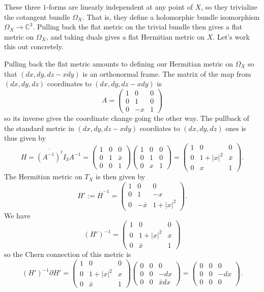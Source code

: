 \documentclass[11pt]{article}
\theoremstyle{definition}
\newcommand{\kk}[1]{\mathbb{#1}}
\begin{document}
These three $1$-forms are linearly independent at any point of $X$, so they trivialize the cotangent bundle $\Omega_X$. That is, they define a holomorphic bundle isomorphism $\Omega_X \to \kk C^3$. Pulling back the flat metric on the trivial bundle then gives a flat metric on $\Omega_X$, and taking duals gives a flat Hermitian metric on $X$. Let's work this out concretely.

Pulling back the flat metric amounts to defining our Hermitian metric on $\Omega_X$ so that $(dx, dy, dz - xdy)$ is an orthonormal frame. The matrix of the map from $(dx, dy, dz)$ coordinates to $(dx, dy, dz - xdy)$ is
$$
A = \begin{pmatrix}
1 & 0 & 0 \\
0 & 1 & 0 \\
0 & -x & 1
\end{pmatrix}
$$
so its inverse gives the coordinate change going the other way. The pullback of the standard metric in $(dx, dy, dz-x dy)$ coordiates to $(dx, dy, dz)$ ones is thus given by
$$
H = \overline{(A^{-1})^t} I_3 A^{-1}
=
\begin{pmatrix}
1 & 0 & 0 \\
0 & 1 & \bar x \\
0 & 0 & 1
\end{pmatrix}
\begin{pmatrix}
1 & 0 & 0 \\
0 & 1 & 0 \\
0 & x & 1
\end{pmatrix}
=
\begin{pmatrix}
1 & 0 & 0 \\
0 & 1+|x|^2 & \bar x \\
0 & x & 1
\end{pmatrix}.
$$
The Hermitian metric on $T_X$ is then given by
$$
H' := \overline{H}^{-1}
= \begin{pmatrix}
1 & 0 & 0 \\
0 & 1 & - x \\
0 & -\bar x & 1+|x|^2
\end{pmatrix}.
$$
We have
$$
(H')^{-1} = \begin{pmatrix}
  1 & 0 & 0 \\
  0 & 1 + |x|^2 & x \\
  0 & \bar x & 1
\end{pmatrix}
$$
so the Chern connection of this metric is
$$
(H')^{-1} \partial H'
= \begin{pmatrix}
  1 & 0 & 0 \\
  0 & 1 + |x|^2 & x \\
  0 & \bar x & 1
\end{pmatrix}
\begin{pmatrix}
0 & 0 & 0 \\
0 & 0 & -dx \\
0 & 0 & \bar x dx
\end{pmatrix}
= \begin{pmatrix}
0 & 0 & 0 \\
0 & 0 & -dx \\
0 & 0 & 0
\end{pmatrix}.
$$
\end{document}
